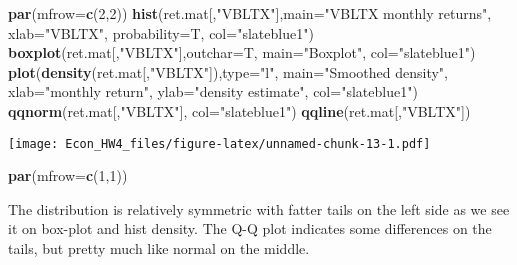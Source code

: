 \documentclass[]{article}
\newenvironment{Shaded}{\begin{snugshade}}{\end{snugshade}}
\newcommand{\KeywordTok}[1]{\textcolor[rgb]{0.13,0.29,0.53}{\textbf{#1}}}
\newcommand{\DataTypeTok}[1]{\textcolor[rgb]{0.13,0.29,0.53}{#1}}
\newcommand{\DecValTok}[1]{\textcolor[rgb]{0.00,0.00,0.81}{#1}}
\newcommand{\StringTok}[1]{\textcolor[rgb]{0.31,0.60,0.02}{#1}}
\newcommand{\NormalTok}[1]{#1}
\begin{document}
\begin{Shaded}
\begin{Highlighting}[]
\KeywordTok{par}\NormalTok{(}\DataTypeTok{mfrow=}\KeywordTok{c}\NormalTok{(}\DecValTok{2}\NormalTok{,}\DecValTok{2}\NormalTok{))}
    \KeywordTok{hist}\NormalTok{(ret.mat[,}\StringTok{"VBLTX"}\NormalTok{],}\DataTypeTok{main=}\StringTok{"VBLTX monthly returns"}\NormalTok{,}
         \DataTypeTok{xlab=}\StringTok{"VBLTX"}\NormalTok{, }\DataTypeTok{probability=}\NormalTok{T, }\DataTypeTok{col=}\StringTok{"slateblue1"}\NormalTok{)}
    \KeywordTok{boxplot}\NormalTok{(ret.mat[,}\StringTok{"VBLTX"}\NormalTok{],}\DataTypeTok{outchar=}\NormalTok{T, }\DataTypeTok{main=}\StringTok{"Boxplot"}\NormalTok{, }\DataTypeTok{col=}\StringTok{"slateblue1"}\NormalTok{)}
    \KeywordTok{plot}\NormalTok{(}\KeywordTok{density}\NormalTok{(ret.mat[,}\StringTok{"VBLTX"}\NormalTok{]),}\DataTypeTok{type=}\StringTok{"l"}\NormalTok{, }\DataTypeTok{main=}\StringTok{"Smoothed density"}\NormalTok{,}
           \DataTypeTok{xlab=}\StringTok{"monthly return"}\NormalTok{, }\DataTypeTok{ylab=}\StringTok{"density estimate"}\NormalTok{, }\DataTypeTok{col=}\StringTok{"slateblue1"}\NormalTok{)}
    \KeywordTok{qqnorm}\NormalTok{(ret.mat[,}\StringTok{"VBLTX"}\NormalTok{], }\DataTypeTok{col=}\StringTok{"slateblue1"}\NormalTok{)}
    \KeywordTok{qqline}\NormalTok{(ret.mat[,}\StringTok{"VBLTX"}\NormalTok{])}
\end{Highlighting}
\end{Shaded}

\texttt{[image: Econ\_HW4\_files/figure-latex/unnamed-chunk-13-1.pdf]}

\begin{Shaded}
\begin{Highlighting}[]
\KeywordTok{par}\NormalTok{(}\DataTypeTok{mfrow=}\KeywordTok{c}\NormalTok{(}\DecValTok{1}\NormalTok{,}\DecValTok{1}\NormalTok{))}
\end{Highlighting}
\end{Shaded}

The distribution is relatively symmetric with fatter tails on the left
side as we see it on box-plot and hist density. The Q-Q plot indicates
some differences on the tails, but pretty much like normal on the
middle.
\end{document}
